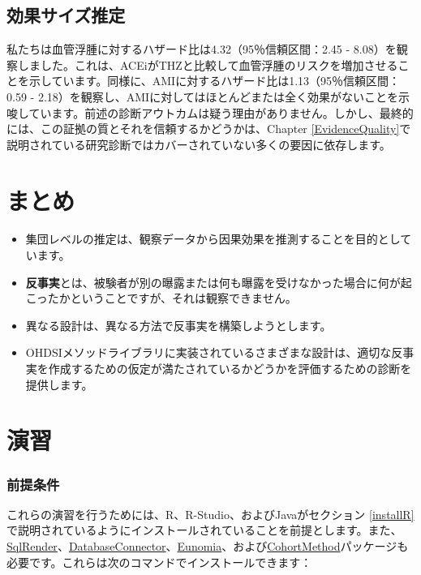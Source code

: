 \documentclass[
  11pt]{book}
\makeatletter
\newenvironment{kframe}{%
\medskip{}
\setlength{\fboxsep}{.8em}
 \def\at@end@of@kframe{}%
 \ifinner\ifhmode%
  \def\at@end@of@kframe{\end{minipage}}%
  \begin{minipage}{\columnwidth}%
 \fi\fi%
 \def\FrameCommand##1{\hskip\@totalleftmargin \hskip-\fboxsep
 \colorbox{myShadeColor}{##1}\hskip-\fboxsep
     \hskip-\linewidth \hskip-\@totalleftmargin \hskip\columnwidth}%
 \MakeFramed {\advance\hsize-\width
   \@totalleftmargin\z@ \linewidth\hsize
   \@setminipage}}%
 {\par\unskip\endMakeFramed%
 \at@end@of@kframe}
\newenvironment{rmdblock}[1]
  {
  \begin{itemize}
  \renewcommand{\labelitemi}{
    \raisebox{-.7\height}[0pt][0pt]{
      {\setkeys{Gin}{width=3em,keepaspectratio}\texttt{[image: images/\#1]}}
    }
  }
  \setlength{\fboxsep}{1em}
  \begin{kframe}
  \item
  }
  {
  \end{kframe}
  \end{itemize}
  }
\newenvironment{rmdsummary}
  {\begin{rmdblock}{summary}}
  {\end{rmdblock}}
\theoremstyle{definition}
\theoremstyle{definition}
\theoremstyle{definition}
\theoremstyle{definition}
\theoremstyle{remark}
\makeatother
\begin{document}
\subsection{効果サイズ推定}\label{ux52b9ux679cux30b5ux30a4ux30baux63a8ux5b9a}

私たちは血管浮腫に対するハザード比は4.32（95％信頼区間：2.45 - 8.08）を観察しました。これは、ACEiがTHZと比較して血管浮腫のリスクを増加させることを示しています。同様に、AMIに対するハザード比は1.13（95％信頼区間：0.59 - 2.18）を観察し、AMIに対してはほとんどまたは全く効果がないことを示唆しています。前述の診断アウトカムは疑う理由がありません。しかし、最終的には、この証拠の質とそれを信頼するかどうかは、Chapter \ref{EvidenceQuality}で説明されている研究診断ではカバーされていない多くの要因に依存します。

\section{まとめ}\label{ux307eux3068ux3081-9}

\begin{rmdsummary}
\begin{itemize}
\item
  集団レベルの推定は、観察データから因果効果を推測することを目的としています。
\item
  \textbf{反事実}とは、被験者が別の曝露または何も曝露を受けなかった場合に何が起こったかということですが、それは観察できません。
\item
  異なる設計は、異なる方法で反事実を構築しようとします。
\item
  OHDSIメソッドライブラリに実装されているさまざまな設計は、適切な反事実を作成するための仮定が満たされているかどうかを評価するための診断を提供します。
\end{itemize}
\end{rmdsummary}

\section{演習}\label{ux6f14ux7fd2-5}

\subsubsection*{前提条件}\label{ux524dux63d0ux6761ux4ef6-7}

これらの演習を行うためには、R、R-Studio、およびJavaがセクション \ref{installR} で説明されているようにインストールされていることを前提とします。また、\href{https://ohdsi.github.io/SqlRender/}{SqlRender}、\href{https://ohdsi.github.io/DatabaseConnector/}{DatabaseConnector}、\href{https://ohdsi.github.io/Eunomia/}{Eunomia}、および\href{https://ohdsi.github.io/CohortMethod/}{CohortMethod}パッケージも必要です。これらは次のコマンドでインストールできます：
\end{document}

